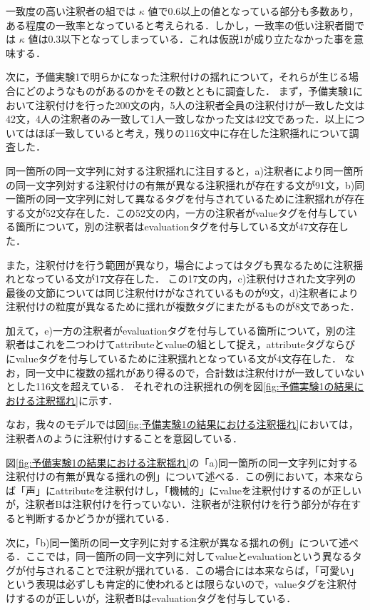 \documentclass[japanese]{jnlp_1.4}
\begin{document}
一致度の高い注釈者の組では $\kappa$ 値で0.6以上の値となっている部分も多数あり，ある程度の一致率となっていると考えられる．しかし，一致率の低い注釈者間では $\kappa$ 値は0.3以下となってしまっている．これは仮説1が成り立たなかった事を意味する．

次に，予備実験1で明らかになった注釈付けの揺れについて，それらが生じる場合にどのようなものがあるのかをその数とともに調査した．
まず，予備実験1において注釈付けを行った200文の内，5人の注釈者全員の注釈付けが一致した文は42文，4人の注釈者のみ一致して1人一致しなかった文は42文であった．以上についてはほぼ一致していると考え，残りの116文中に存在した注釈揺れについて調査した．

同一箇所の同一文字列に対する注釈揺れに注目すると，a)注釈者により同一箇所の同一文字列対する注釈付けの有無が異なる注釈揺れが存在する文が91文，b)同一箇所の同一文字列に対して異なるタグを付与されているために注釈揺れが存在する文が52文存在した．この52文の内，一方の注釈者がvalueタグを付与している箇所について，別の注釈者はevaluationタグを付与している文が47文存在した．

また，注釈付けを行う範囲が異なり，場合によってはタグも異なるために注釈揺れとなっている文が17文存在した．
この17文の内，c)注釈付けされた文字列の最後の文節については同じ注釈付けがなされているものが9文，d)注釈者により注釈付けの粒度が異なるために揺れが複数タグにまたがるものが8文であった．

加えて，e)一方の注釈者がevaluationタグを付与している箇所について，別の注釈者はこれを二つわけてattributeとvalueの組として捉え，attributeタグならびにvalueタグを付与しているために注釈揺れとなっている文が4文存在した．
なお，同一文中に複数の揺れがあり得るので，合計数は注釈付けが一致していないとした116文を超えている．
それぞれの注釈揺れの例を図\ref{fig:予備実験1の結果における注釈揺れ}に示す．

なお，我々のモデルでは図\ref{fig:予備実験1の結果における注釈揺れ}においては，注釈者Aのように注釈付けすることを意図している．

図\ref{fig:予備実験1の結果における注釈揺れ}の「a)同一箇所の同一文字列に対する注釈付けの有無が異なる揺れの例」について述べる．この例において，本来ならば「声」にattributeを注釈付けし，「機械的」にvalueを注釈付けするのが正しいが，注釈者Bは注釈付けを行っていない．注釈者が注釈付けを行う部分が存在すると判断するかどうかが揺れている．


次に，「b)同一箇所の同一文字列に対する注釈が異なる揺れの例」について述べる．ここでは，同一箇所の同一文字列に対してvalueとevaluationという異なるタグが付与されることで注釈が揺れている．この場合には本来ならば，「可愛い」という表現は必ずしも肯定的に使われるとは限らないので，valueタグを注釈付けするのが正しいが，注釈者Bはevaluationタグを付与している．
\end{document}
